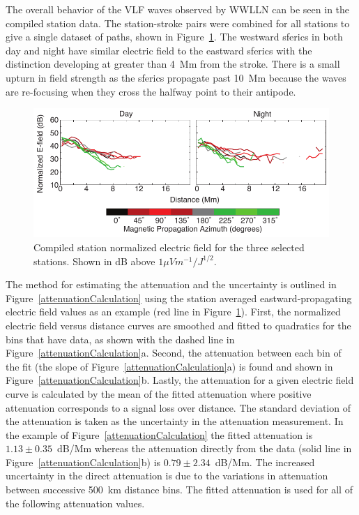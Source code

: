 The overall behavior of the VLF waves observed by WWLLN can be seen in the compiled station data.
The station-stroke pairs were combined for all stations to give a single dataset of paths, shown in Figure~\ref{azimuthAverage}.
The westward sferics in both day and night have similar electric field to the eastward sferics with the distinction developing at greater than 4~Mm from the stroke.
There is a small upturn in field strength as the sferics propagate past 10~Mm because the waves are re-focusing when they cross the halfway point to their antipode.

\begin{figure}[h!t]
    \centering
    \includegraphics[scale=1]{Azimuth/Figures/azimuthAverage.pdf} 
    \caption{Compiled station normalized electric field for the three selected stations.
    	Shown in dB above $1 \mu Vm^{-1}/J^{1/2}$.}
    \label{azimuthAverage}
 \end{figure}

The method for estimating the attenuation and the uncertainty is outlined in Figure~\ref{attenuationCalculation} using the station averaged eastward-propagating electric field values as an example (red line in Figure~\ref{azimuthAverage}).
First, the normalized electric field versus distance curves are smoothed and fitted to quadratics for the bins that have data, as shown with the dashed line in Figure~\ref{attenuationCalculation}a.
Second, the attenuation between each bin of the fit (the slope of Figure~\ref{attenuationCalculation}a) is found and shown in Figure~\ref{attenuationCalculation}b.
Lastly, the attenuation for a given electric field curve is calculated by the mean of the fitted attenuation where positive attenuation corresponds to a signal loss over distance.
The standard deviation of the attenuation is taken as the uncertainty in the attenuation measurement.
In the example of Figure~\ref{attenuationCalculation} the fitted attenuation is $1.13\pm0.35$~dB/Mm whereas the attenuation directly from the data (solid line in Figure~\ref{attenuationCalculation}b) is $0.79\pm2.34$~dB/Mm.
The increased uncertainty in the direct attenuation is due to the variations in attenuation between successive 500~km distance bins.
The fitted attenuation is used for all of the following attenuation values.

